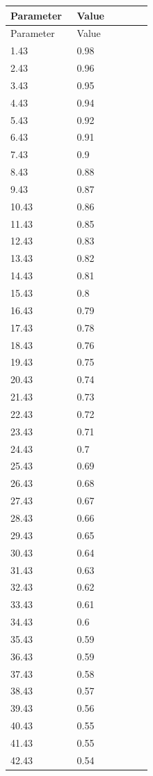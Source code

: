 \documentclass{article}
\begin{document}
\begin{longtable}{p{0.43\linewidth} p{0.49\linewidth}}
\toprule
Parameter & Value \\
\midrule
\endfirsthead
\toprule
Parameter & Value \\
\midrule
\endhead
1.43 & 0.98 \\
2.43 & 0.96 \\
3.43 & 0.95 \\
4.43 & 0.94 \\
5.43 & 0.92 \\
6.43 & 0.91 \\
7.43 & 0.9 \\
8.43 & 0.88 \\
9.43 & 0.87 \\
10.43 & 0.86 \\
11.43 & 0.85 \\
12.43 & 0.83 \\
13.43 & 0.82 \\
14.43 & 0.81 \\
15.43 & 0.8 \\
16.43 & 0.79 \\
17.43 & 0.78 \\
18.43 & 0.76 \\
19.43 & 0.75 \\
20.43 & 0.74 \\
21.43 & 0.73 \\
22.43 & 0.72 \\
23.43 & 0.71 \\
24.43 & 0.7 \\
25.43 & 0.69 \\
26.43 & 0.68 \\
27.43 & 0.67 \\
28.43 & 0.66 \\
29.43 & 0.65 \\
30.43 & 0.64 \\
31.43 & 0.63 \\
32.43 & 0.62 \\
33.43 & 0.61 \\
34.43 & 0.6 \\
35.43 & 0.59 \\
36.43 & 0.59 \\
37.43 & 0.58 \\
38.43 & 0.57 \\
39.43 & 0.56 \\
40.43 & 0.55 \\
41.43 & 0.55 \\
42.43 & 0.54 \\

\end{longtable}
\end{document}
